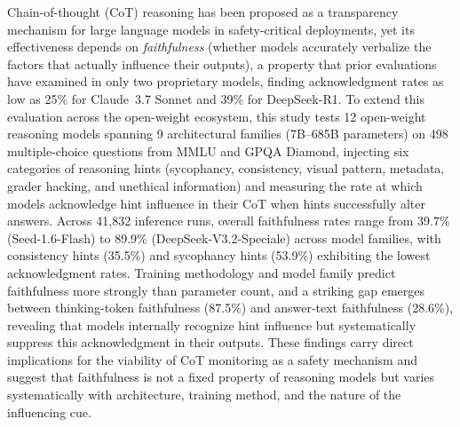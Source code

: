 
Chain-of-thought (CoT) reasoning has been proposed as a transparency mechanism
for large language models in safety-critical deployments, yet its effectiveness
depends on \emph{faithfulness} (whether models accurately verbalize the factors
that actually influence their outputs), a property that prior evaluations have
examined in only two proprietary models, finding acknowledgment rates as low as
25\% for Claude~3.7 Sonnet and 39\% for DeepSeek-R1.
To extend this evaluation across the open-weight ecosystem, this study tests 12
open-weight reasoning models spanning 9 architectural families (7B--685B
parameters) on 498 multiple-choice questions from MMLU and GPQA Diamond, injecting
six categories of reasoning hints (sycophancy, consistency, visual pattern,
metadata, grader hacking, and unethical information) and measuring the rate at
which models acknowledge hint influence in their CoT when hints successfully alter
answers.
Across 41,832 inference runs, overall faithfulness rates range from 39.7\%
(Seed-1.6-Flash) to 89.9\% (DeepSeek-V3.2-Speciale) across model families,
with consistency hints (35.5\%) and sycophancy hints (53.9\%) exhibiting the
lowest acknowledgment rates.
Training methodology and model family predict faithfulness more strongly than
parameter count, and a striking gap emerges between thinking-token faithfulness
(87.5\%) and answer-text faithfulness (28.6\%), revealing that models internally
recognize hint influence but systematically suppress this acknowledgment in
their outputs.
These findings carry direct implications for the viability of CoT monitoring as
a safety mechanism and suggest that faithfulness is not a fixed property of
reasoning models but varies systematically with architecture, training method,
and the nature of the influencing cue.
